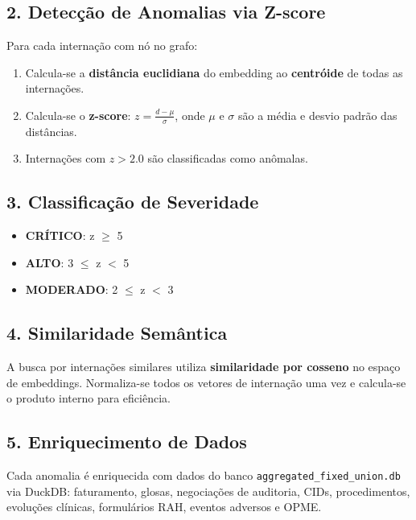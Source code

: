 \documentclass[a4paper,10pt]{article}
\begin{document}
\subsection*{2. Detec\c{c}\~{a}o de Anomalias via Z-score}
Para cada interna\c{c}\~{a}o com n\'{o} no grafo:
\begin{enumerate}[nosep]
  \item Calcula-se a \textbf{dist\^{a}ncia euclidiana} do embedding ao \textbf{centr\'{o}ide} de todas as interna\c{c}\~{o}es.
  \item Calcula-se o \textbf{z-score}: $z = \frac{d - \mu}{\sigma}$, onde $\mu$ e $\sigma$ s\~{a}o a m\'{e}dia e desvio padr\~{a}o das dist\^{a}ncias.
  \item Interna\c{c}\~{o}es com $z > 2.0$ s\~{a}o classificadas como an\^{o}malas.
\end{enumerate}

\subsection*{3. Classifica\c{c}\~{a}o de Severidade}
\begin{itemize}[nosep]
  \item \textcolor{anomred}{\textbf{CR\'ITICO}}: z $\geq$ 5
  \item \textcolor{anomorange}{\textbf{ALTO}}: 3 $\leq$ z $<$ 5
  \item \textcolor{anomyellow}{\textbf{MODERADO}}: 2 $\leq$ z $<$ 3
\end{itemize}

\subsection*{4. Similaridade Sem\^{a}ntica}
A busca por interna\c{c}\~{o}es similares utiliza \textbf{similaridade por cosseno} no espa\c{c}o de embeddings.
Normaliza-se todos os vetores de interna\c{c}\~{a}o uma vez e calcula-se o produto interno para efici\^{e}ncia.

\subsection*{5. Enriquecimento de Dados}
Cada anomalia \'{e} enriquecida com dados do banco \texttt{aggregated\_fixed\_union.db} via DuckDB:
faturamento, glosas, negocia\c{c}\~{o}es de auditoria, CIDs, procedimentos, evolu\c{c}\~{o}es cl\'{i}nicas,
formul\'{a}rios RAH, eventos adversos e OPME.
\end{document}
